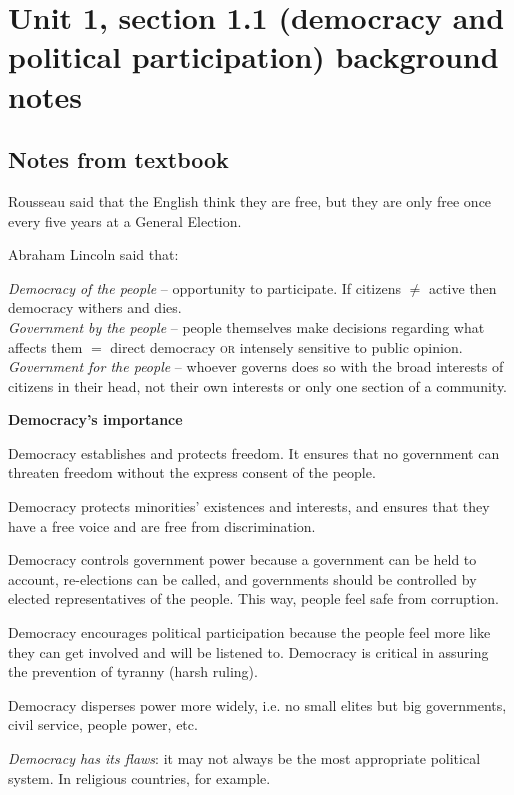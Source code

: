 \documentclass[12pt]{article}
\begin{document}
\section*{Unit 1, section 1.1 (democracy and political participation) background notes}

	\subsection*{Notes from textbook}
	
		Rousseau said that the English think they are free, but they are only free once every five years at a General Election.

		Abraham Lincoln said that:
		
		\textsl{Democracy of the people} -- opportunity to participate.  If citizens $\not=$ active then democracy withers and dies.\\
		\textsl{Government by the people} -- people themselves make decisions regarding what affects them $=$ direct democracy \textsc{or} intensely sensitive to public opinion.\\
		\textsl{Government for the people} -- whoever governs does so with the broad interests of citizens in their head, not their own interests or only one section of a community.
		
		\textbf{Democracy's importance}
		
		Democracy establishes and protects freedom.  It ensures that no government can threaten freedom without the express consent of the people.

		Democracy protects minorities' existences and interests, and ensures that they have a free voice and are free from discrimination.

		Democracy controls government power because a government can be held to account, re-elections can be called, and governments should be controlled by elected representatives of the people.  This way, people feel safe from corruption.

		Democracy encourages political participation because the people feel more like they can get involved and will be listened to.  Democracy is critical in assuring the prevention of tyranny (harsh ruling).
		
		Democracy disperses power more widely, i.e. no small elites but big governments, civil service, people power, etc.
		
		\textit{Democracy has its flaws}: it may not always be the most appropriate political system.  In religious countries, for example.
		
\end{document}
